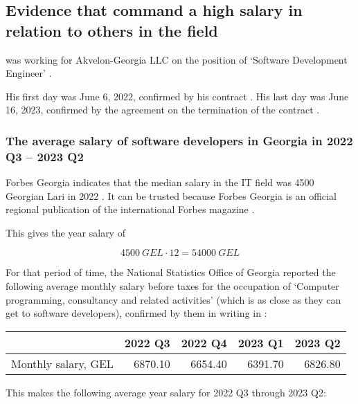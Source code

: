 \subsection{%
    Evidence that \mrl command a high salary in relation to others in the field%
}
\label{subsec:Salary}

\mrl was working for Akvelon-Georgia LLC on the position of `Software Development Engineer'
.

His first day was June 6, 2022, confirmed by his contract .
His last day was June 16, 2023, confirmed by the agreement on the termination of the contract .


\subsubsection{The average salary of software developers in Georgia in 2022 Q3 -- 2023 Q2}



Forbes Georgia indicates that the median salary in the IT field was 4500 Georgian Lari in 2022
.
It can be trusted because Forbes Georgia is an official regional publication
of the international Forbes magazine .

This gives the year salary of

\[
    4500\:GEL \cdot 12 = 54000\:GEL
\]


For that period of time, the National Statistics Office of Georgia
reported the following average monthly salary before taxes for the occupation of
`Computer programming, consultancy and related activities'
(which is as close as they can get to software developers),
confirmed by them in writing in :

\begin{center}
    \begin{tabular}{|l|r|r|r|r|}
        \hline
        & 2022 Q3 & 2022 Q4 & 2023 Q1 & 2023 Q2 \\
        \hline
        Monthly salary, GEL & 6870.10 & 6654.40 & 6391.70 & 6826.80 \\
        \hline
    \end{tabular}
\end{center}

This makes the following average year salary for 2022 Q3 through 2023 Q2:

